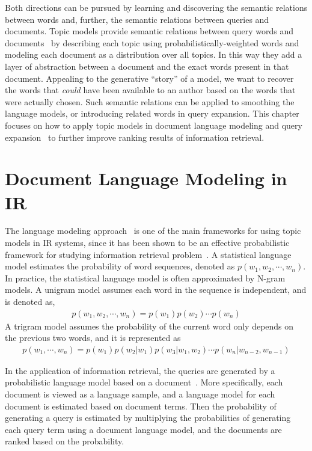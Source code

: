 Both directions can be pursued by learning and discovering the
semantic relations between words and, further, the semantic relations
between queries and documents. Topic models provide semantic relations between query words and
documents~\citep{deerwester-90,hofmann-99a} by describing each topic
using probabilistically-weighted words and modeling each document as a distribution over
all topics.
In this way they add a layer of abstraction between a document and the exact words present in that document.
Appealing to the generative ``story'' of a model, we want to recover the words that {\em could} have been available to an author based on the words that were actually chosen.
Such semantic relations
can be applied to smoothing the language models, or introducing
related words in query expansion. This chapter focuses on how to apply
topic models in document language modeling \citep{Lu-2011,wei-06} and
query expansion~\citep{Park-2009,Andrzejewski-2011} to further improve
 ranking results of information retrieval.

\section{Document Language Modeling in IR}
\label{sec:ir-lm}

The language modeling approach~\citep{croft-03,PonteCroft,song-99} is
one of the main frameworks for using topic models in IR systems, since
it has been shown to be an effective probabilistic framework for studying
information retrieval problem~\citep{PonteCroft,berger-99}.
A statistical language model estimates the probability of word
sequences, denoted as $p(w_1,w_2,\cdots,w_n)$. In practice, the
statistical language model is often approximated by N-gram models. A
unigram model assumes each word in the sequence is independent, and is
denoted as,
\begin{align}
p(w_1,w_2,\cdots,w_n) = p(w_1)p(w_2) \cdots p(w_n)
\end{align}
A trigram model assumes the probability of the current word only
depends on the previous two words, and it is represented as
\begin{align}
p(w_1,\cdots,w_n)=p(w_1)p(w_2|w_1)p(w_3|w_1,w_2)\cdots p(w_n|w_{n-2},w_{n-1})
\end{align}

In the application of information retrieval, the queries are generated
by a probabilistic language model based on a
document~\citep{zhai-01}. More specifically, each document is viewed
as a language sample, and a language model for each document is
estimated based on document terms. Then the
probability of generating a query is estimated by multiplying the probabilities of
generating each query term using a document language model,
and the documents are ranked based on the probability.

